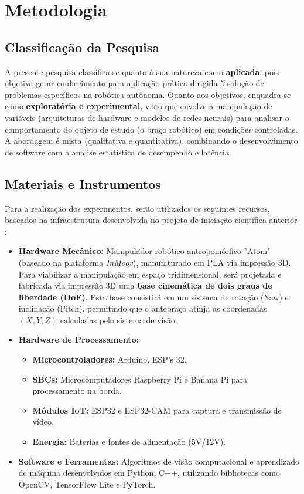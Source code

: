 \section*{Metodologia}

\subsection*{Classificação da Pesquisa}

A presente pesquisa classifica-se quanto à sua natureza como \textbf{aplicada}, pois objetiva gerar conhecimento para aplicação prática dirigida à solução de problemas específicos na robótica autônoma. Quanto aos objetivos, enquadra-se como \textbf{exploratória e experimental}, visto que envolve a manipulação de variáveis (arquiteturas de hardware e modelos de redes neurais) para analisar o comportamento do objeto de estudo (o braço robótico) em condições controladas. A abordagem é mista (qualitativa e quantitativa), combinando o desenvolvimento de software com a análise estatística de desempenho e latência.

\subsection*{Materiais e Instrumentos}

Para a realização dos experimentos, serão utilizados os seguintes recursos, baseados na infraestrutura desenvolvida no projeto de iniciação científica anterior :
\begin{itemize}
    \item \textbf{Hardware Mecânico:} Manipulador robótico antropomórfico "Atom" (baseado na plataforma \textit{InMoov}), manufaturado em PLA via impressão 3D. Para viabilizar a manipulação em espaço tridimensional, será projetada e fabricada via impressão 3D uma \textbf{base cinemática de dois graus de liberdade (DoF)}. Esta base consistirá em um sistema de rotação (Yaw) e inclinação (Pitch), permitindo que o antebraço atinja as coordenadas $(X, Y, Z)$ calculadas pelo sistema de visão.
    \item \textbf{Hardware de Processamento:}
    \begin{itemize}
        \item \textbf{Microcontroladores:} Arduino, ESP's 32.
        \item \textbf{SBCs:} Microcomputadores Raspberry Pi e Banana Pi para processamento na borda.
    \item \textbf{Módulos IoT:} ESP32 e ESP32-CAM para captura e transmissão de vídeo.
    \item \textbf{Energia:} Baterias e fontes de alimentação (5V/12V).
    \end{itemize}
    \item \textbf{Software e Ferramentas:} Algoritmos de visão computacional e aprendizado de máquina desenvolvidos em Python, C++, utilizando bibliotecas como OpenCV, TensorFlow Lite e PyTorch.
\end{itemize}

